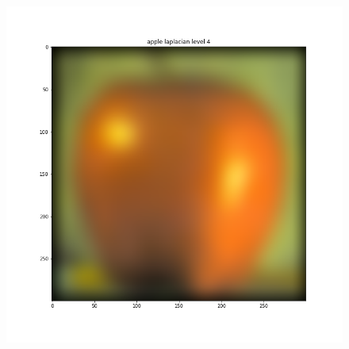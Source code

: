 \documentclass{article}
\begin{document}
\begin{figure}[!htb]
\endminipage
{}
    \includegraphics[width=\linewidth]{apple laplacian level 4.png}
\endminipage
\end{figure}
\end{document}
